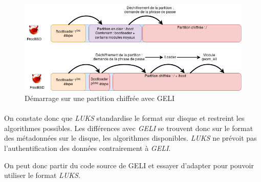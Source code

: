 \paragraph{}
\begin{figure}[h]
\centering
\includegraphics[width=.9\linewidth]{etat_art/DemarrageFreeBSD.png}
\caption{\label{fig:demarrageFreeBSD}Démarrage sur une partition chiffrée avec GELI}
\end{figure}

\paragraph{}
On constate donc que {\em LUKS} standardise le format sur disque et restreint
les algorithmes possibles. Les différences avec {\em GELI} se trouvent donc
sur le format des métadonnées sur le disque, les algorithmes disponibles.
{\em LUKS} ne prévoit pas l'authentification des données
contrairement à {\em GELI}.

On peut donc partir du code source de GELI et essayer d'adapter pour pouvoir
utiliser le format {\em LUKS}.
